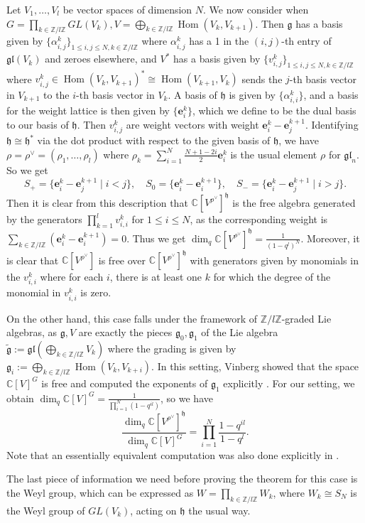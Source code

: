 \documentclass[12pt]{article}
\renewcommand{\b}[1]{\textbf{#1}}
\newcommand{\Z}{\mathbb{Z}}
\newcommand{\C}{\mathbb{C}}
\theoremstyle{definition}
\theoremstyle{remark}
\newcommand{\g}{\mathfrak{g}}
\newcommand{\h}{\mathfrak{h}}
\DeclareMathOperator{\Hom}{Hom}
\newcommand{\gl}{\mathfrak{gl}}
\begin{document}
Let $V_1,\dots,V_l$ be vector spaces of dimension $N$. We now consider when $G=\prod_{k\in\Z/l\Z}GL(V_k),V=\bigoplus_{k\in\Z/l\Z}\Hom(V_k,V_{k+1})$. Then $\g$ has a basis given by $\{\alpha_{i,j}^k\}_{1\leq i,j\leq N,k\in\Z/l\Z}$ where $\alpha_{i,j}^k$ has a 1 in the $(i,j)$-th entry of $\gl(V_k)$ and zeroes elsewhere, and $V^*$ has a basis given by $\{v_{i,j}^k\}_{1\leq i,j\leq N,k\in\Z/l\Z}$ where $v_{i,j}^k\in\Hom(V_k,V_{k+1})^*\cong\Hom(V_{k+1},V_k)$ sends the $j$-th basis vector in $V_{k+1}$ to the $i$-th basis vector in $V_k$. A basis of $\h$ is given by $\{\alpha_{i,i}^k\}$, and a basis for the weight lattice is then given by $\{\b{e}_i^k\}$, which we define to be the dual basis to our basis of $\h$. Then $v_{i,j}^k$ are weight vectors with weight $\b{e}_i^k-\b{e}_j^{k+1}$. Identifying $\h\cong\h^*$ via the dot product with respect to the given basis of $\h$, we have $\rho=\rho^\vee=(\rho_1,\dots,\rho_l)$ where $\rho_k=\sum_{i=1}^N\frac{N+1-2i}{2}\b{e}_i^k$ is the usual element $\rho$ for $\gl_n$. So we get
\[S_+=\{\b{e}_i^k-\b{e}_j^{k+1}\mid i<j\},\quad S_0=\{\b{e}_i^k-\b{e}_i^{k+1}\},\quad S_-=\{\b{e}_i^k-\b{e}_j^{k+1}\mid i>j\}.\]
Then it is clear from this description that $\C[V^{\rho^\vee}]^\h$ is the free algebra generated by the generators $\prod_{k=1}^lv_{i,i}^k$ for $1\leq i\leq N$, as the corresponding weight is $\sum_{k\in\Z/l\Z}(\b{e}_i^k-\b{e}_i^{k+1})=0$. Thus we get $\dim_q\C[V^{\rho^\vee}]^\h=\frac{1}{(1-q^l)^N}$. Moreover, it is clear that $\C[V^{\rho^\vee}]$ is free over $\C[V^{\rho^\vee}]^\h$ with generators given by monomials in the $v_{i,i}^k$ where for each $i$, there is at least one $k$ for which the degree of the monomial in $v_{i,i}^k$ is zero.

On the other hand, this case falls under the framework of $\Z/l\Z$-graded Lie algebras, as $\g,V$ are exactly the pieces $\g_0,\g_1$ of the Lie algebra $\tilde{\g}:=\gl(\bigoplus_{k\in\Z/l\Z}V_k)$ where the grading is given by $\g_i:=\bigoplus_{k\in\Z/l\Z}\Hom(V_k,V_{k+i})$. In this setting, Vinberg showed that the space $\C[V]^G$ is free and computed the exponents of $\g_1$ explicitly \cite{vinberg}. For our setting, we obtain $\dim_q\C[V]^G=\frac{1}{\prod_{i=1}^N(1-q^{il})}$, so we have
\[\frac{\dim_q\C[V^{\rho^\vee}]^\h}{\dim_q\C[V]^G}=\prod_{i=1}^N\frac{1-q^{il}}{1-q^l}.\]
Note that an essentially equivalent computation was also done explicitly in \cite{gancyclicquiver}.

The last piece of information we need before proving the theorem for this case is the Weyl group, which can be expressed as $W=\prod_{k\in\Z/l\Z}W_k$, where $W_k\cong S_N$ is the Weyl group of $GL(V_k)$, acting on $\h$ the usual way.
\end{document}
